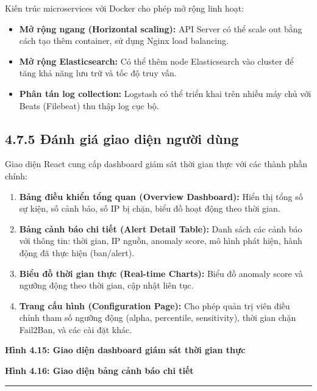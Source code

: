 \documentclass[
  a4paper]{report}
\providecommand{\tightlist}{%
  \setlength{\itemsep}{0pt}\setlength{\parskip}{0pt}}
\begin{document}
Kiến trúc microservices với Docker cho phép mở rộng linh hoạt:

\begin{itemize}
\tightlist
\item
  \textbf{Mở rộng ngang (Horizontal scaling):} API Server có thể scale
  out bằng cách tạo thêm container, sử dụng Nginx load balancing.
\item
  \textbf{Mở rộng Elasticsearch:} Có thể thêm node Elasticsearch vào
  cluster để tăng khả năng lưu trữ và tốc độ truy vấn.
\item
  \textbf{Phân tán log collection:} Logstash có thể triển khai trên
  nhiều máy chủ với Beats (Filebeat) thu thập log cục bộ.
\end{itemize}

\subsection{4.7.5 Đánh giá giao diện người
dùng}\label{ux111uxe1nh-giuxe1-giao-diux1ec7n-ngux1b0ux1eddi-duxf9ng}

Giao diện React cung cấp dashboard giám sát thời gian thực với các thành
phần chính:

\begin{enumerate}
\def\labelenumi{\arabic{enumi}.}
\item
  \textbf{Bảng điều khiển tổng quan (Overview Dashboard):} Hiển thị tổng
  số sự kiện, số cảnh báo, số IP bị chặn, biểu đồ hoạt động theo thời
  gian.
\item
  \textbf{Bảng cảnh báo chi tiết (Alert Detail Table):} Danh sách các
  cảnh báo với thông tin: thời gian, IP nguồn, anomaly score, mô hình
  phát hiện, hành động đã thực hiện (ban/alert).
\item
  \textbf{Biểu đồ thời gian thực (Real-time Charts):} Biểu đồ anomaly
  score và ngưỡng động theo thời gian, cập nhật liên tục.
\item
  \textbf{Trang cấu hình (Configuration Page):} Cho phép quản trị viên
  điều chỉnh tham số ngưỡng động (alpha, percentile, sensitivity), thời
  gian chặn Fail2Ban, và các cài đặt khác.
\end{enumerate}

\textbf{Hình 4.15: Giao diện dashboard giám sát thời gian thực}

\textbf{Hình 4.16: Giao diện bảng cảnh báo chi tiết}

\begin{center}\rule{0.5\linewidth}{0.5pt}\end{center}
\end{document}
